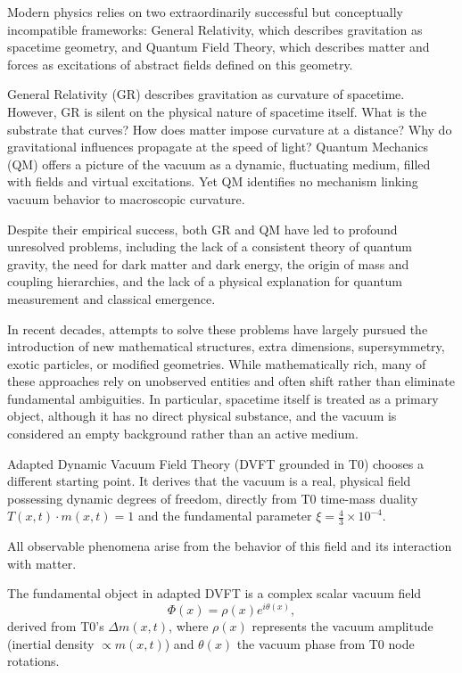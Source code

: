 	Modern physics relies on two extraordinarily successful but conceptually incompatible frameworks:
	General Relativity, which describes gravitation as spacetime geometry, and Quantum Field Theory, which describes matter and forces as excitations of abstract fields defined on this geometry.
	
	General Relativity (GR) describes gravitation as curvature of spacetime.
	However, GR is silent on the physical nature of spacetime itself.
	What is the substrate that curves?
	How does matter impose curvature at a distance?
	Why do gravitational influences propagate at the speed of light?
	Quantum Mechanics (QM)
	offers a picture of the vacuum as a dynamic, fluctuating medium, filled with fields and virtual excitations.
	Yet QM identifies no mechanism linking vacuum behavior to macroscopic curvature.
	
	Despite their empirical success, both GR and QM have led to profound unresolved problems, including
	the lack of a consistent theory of quantum gravity, the need for dark matter and dark energy, the origin
	of mass and coupling hierarchies, and the lack of a physical explanation for quantum measurement and
	classical emergence.
	
	In recent decades, attempts to solve these problems have largely pursued the introduction of new mathematical structures, extra dimensions, supersymmetry, exotic particles, or modified geometries.
	While mathematically rich, many of these approaches rely on unobserved entities and often shift rather than eliminate fundamental ambiguities.
	In particular, spacetime itself is treated as a primary object, although it has no direct physical substance, and the vacuum is considered an empty background rather than an active medium.
	
	Adapted Dynamic Vacuum Field Theory (DVFT grounded in T0) chooses a different starting point.
	It derives that the vacuum is a real, physical field possessing dynamic degrees of freedom, directly from T0 time-mass duality $T(x,t) \cdot m(x,t) = 1$ and the fundamental parameter $\xi = \frac{4}{3} \times 10^{-4}$.
	
	All observable phenomena arise from the behavior of this field and its interaction with matter.
	
	The fundamental object in adapted DVFT is a complex scalar vacuum field
	\[
	\Phi(x)=\rho(x)e^{i\theta(x)},
	\]
	derived from T0's $\Delta m(x,t)$, where $\rho(x)$ represents the vacuum amplitude (inertial density $\propto m(x,t)$) and $\theta(x)$
	the vacuum phase from T0 node rotations.
	
